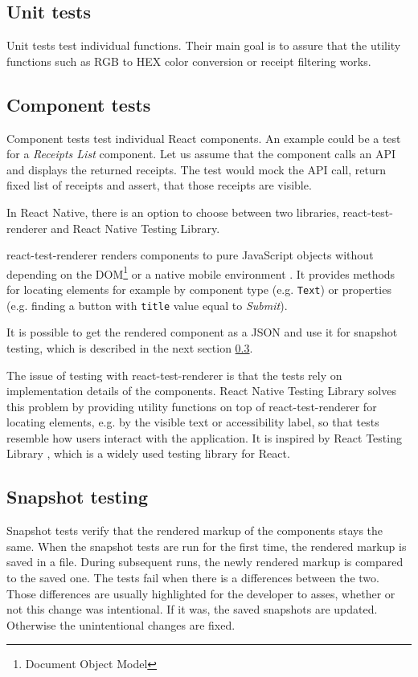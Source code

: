 \documentclass[
  digital, %
  table,   %
  oneside, %
  lof,     %
  lot,     %
]{fithesis3}
\begin{document}
\subsection{Unit tests}
Unit tests test individual functions. Their main goal is to assure that the utility functions such as RGB to HEX color conversion or receipt filtering works.

\subsection{Component tests}
Component tests test individual React components. An example could be a test for a \textit{Receipts List} component. Let us assume that the component calls an API and displays the returned receipts. The test would mock the API call, return fixed list of receipts and assert, that those receipts are visible.

In React Native, there is an option to choose between two libraries, react-test-renderer and React Native Testing Library. 

react-test-renderer renders components to pure JavaScript objects without depending on the DOM\footnote{Document Object Model} or a native mobile environment \cite{ReactTestRenderer}. It provides methods for locating elements for example by component type (e.g. \texttt{Text}) or properties (e.g. finding a button with \texttt{title} value equal to \textit{Submit}).

It is possible to get the rendered component as a JSON and use it for snapshot testing, which is described in the next section \ref{sect:snapshot_testing}.

The issue of testing with react-test-renderer is that the tests rely on implementation details of the components. React Native Testing Library solves this problem by providing utility functions on top of react-test-renderer \cite{ReactNativeTestingLibrary} for locating elements, e.g. by the visible text or accessibility label, so that tests resemble how users interact with the application. It is inspired by React Testing Library \cite{ReactNativeTestingLibrary}, which is a widely used testing library for React.

\subsection{Snapshot testing}
\label{sect:snapshot_testing}
Snapshot tests verify that the rendered markup of the components stays the same. When the snapshot tests are run for the first time, the rendered markup is saved in a file.
During subsequent runs, the newly rendered markup is compared to the saved one. The tests fail when there is a differences between the two. Those differences are usually highlighted for the developer to asses, whether or not this change was intentional. If it was, the saved snapshots are updated. Otherwise the unintentional changes are fixed.
\end{document}
